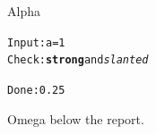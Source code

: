 \documentclass[11pt,aspectratio=169]{beamer}
\begin{document}
\begin{frame}[fragile]{Alpha}
\begin{alltt}
Input:     a = 1
Check:     \textbf{strong} and \emph{slanted}

Done:      0.25
\end{alltt}
Omega below the report.
\end{frame}
\end{document}

